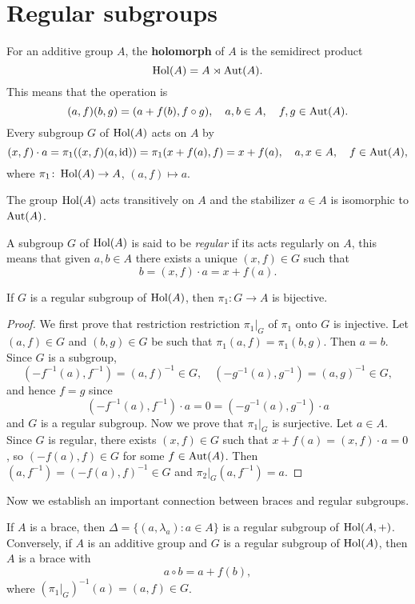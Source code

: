 \chapter{Regular subgroups}

For an additive group $A$, the \textbf{holomorph} of $A$ is the semidirect product 
\[
	\operatorname{Hol}(A)=A\rtimes\operatorname{Aut}(A).
\]
This means that the operation is 
\[
	(a,f)(b,g)=(a+f(b),f\circ g),\quad
	a,b\in A,\quad
	f,g\in\operatorname{Aut}(A).
\]
Every subgroup $G$ of $\operatorname{Hol}(A)$ acts on $A$ by 
\[
	(x,f)\cdot a=\pi_1( (x,f)(a,\operatorname{id}) )=\pi_1(x+f(a),f)=x+f(a),\quad
	a,x\in A,\quad 
	f\in\operatorname{Aut}(A),
\]
where $\pi_1\colon \operatorname{Hol}(A)\to A$, $(a,f)\mapsto a$. 

\begin{exercise}
    The group $\operatorname{Hol}(A)$ acts transitively on $A$ 
	and the stabilizer $a\in A$ 
	is isomorphic to $\operatorname{Aut}(A)$. 
\end{exercise}

A subgroup $G$ of $\operatorname{Hol}(A)$ is said to be \emph{regular} 
if its acts regularly on $A$, this means that 
given $a,b\in A$ there exists a unique $(x,f)\in G$ such that
\[
	b=(x,f)\cdot a=x+f(a).
\]

\begin{lemma}
    \label{lem:bijective}
	If $G$ is a regular subgroup of $\operatorname{Hol}(A)$, then $\pi_1\colon G\to A$ is bijective. 
\end{lemma}

\begin{proof}
	We first prove that restriction restriction $\pi_1|_G$ of $\pi_1$ onto $G$ is injective. Let $(a,f)\in G$ and $(b,g)\in G$
	be such that 
	$\pi_1(a,f)=\pi_1(b,g)$. Then $a=b$. Since $G$ is a
	subgroup, 
	\[
		(-f^{-1}(a),f^{-1})=(a,f)^{-1}\in G,
	    \quad
		(-g^{-1}(a),g^{-1})=(a,g)^{-1}\in G,
	\]
	and hence $f=g$ since
	\[
	(-f^{-1}(a),f^{-1})\cdot a=0=(-g^{-1}(a),g^{-1})\cdot a 
	\]
	and $G$ is a regular subgroup.
	Now we prove that $\pi_1|_G$ is surjective. Let $a\in A$. 
	Since $G$ is regular, there exists $(x,f)\in G$ such that $x+f(a)=(x,f)\cdot a=0$, so $(-f(a),f)\in G$ for some $f\in\operatorname{Aut}(A)$. 
	Then $(a,f^{-1})=(-f(a),f)^{-1}\in G$ and $\pi_2|_G(a,f^{-1})=a$. 
\end{proof}

Now we establish an important connection between braces and regular subgroups. 

\begin{theorem}
\label{thm:regular}
	If $A$ is a brace, then $\Delta=\{(a,\lambda_a):a\in A\}$ is a regular subgroup of 
	$\operatorname{Hol}(A,+)$. Conversely, if $A$ is an additive group and 
	$G$ is a regular subgroup of $\operatorname{Hol}(A)$, then $A$ is 
	a brace with 
	\[
		a\circ b=a+f(b),
	\]
	where $(\pi_1|_G)^{-1}(a)=(a,f)\in G$. 
\end{theorem}

